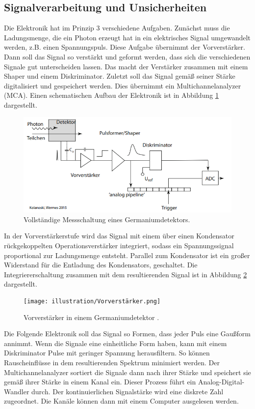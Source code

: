 \subsection{Signalverarbeitung und Unsicherheiten}
Die Elektronik hat im Prinzip 3 verschiedene Aufgaben. Zunächst muss die Ladungsmenge, die ein Photon erzeugt hat in ein elektrisches Signal umgewandelt werden, z.B. einen Spannungspuls.
Diese Aufgabe übernimmt der Vorverstärker. Dann soll das Signal so verstärkt und geformt werden, dass sich die verschiedenen Signale gut unterscheiden lassen. Das macht der Verstärker 
zusammen mit einem Shaper und einem Diskriminator. Zuletzt soll das Signal gemäß seiner Stärke digitalisiert und gespeichert werden. Dies übernimmt ein Multichannelanalyzer (MCA).
Einen schematischen Aufbau der Elektronik ist in Abbildung \ref{fig:Schaltung} dargestellt.
\begin{figure}
    \centering
    \includegraphics[scale=0.8]{illustration/Messchaltung.png}
    \caption{Vollständige Messschaltung eines Germaniumdetektors\cite{Detektor}.}
    \label{fig:Schaltung}
\end{figure}
\noindent In der Vorverstärkerstufe wird das Signal mit einem über einen Kondensator rückgekoppelten Operationsverstärker integriert, sodass ein Spannungssignal proportional zur Ladungsmenge entsteht.
Parallel zum Kondensator ist ein großer Widerstand für die Entladung des Kondensators, geschaltet. Die Integriererschaltung zusammen mit dem resultierenden Signal ist in Abbildung \ref{fig:PreAmp} dargestellt.
\begin{figure}[H]
    \centering
    \texttt{[image: illustration/Vorverstärker.png]}
    \caption{Vorverstärker in einem Germaniumdetektor \cite{Detektor}.}
    \label{fig:PreAmp}
\end{figure}
Die Folgende Elektronik soll das Signal so Formen, dass jeder Puls eine Gaußform annimmt. Wenn die Signale eine einheitliche Form haben, kann mit einem Diskriminator
Pulse mit geringer Spannung herausfiltern. So können Rauscheinflüsse in dem resultierenden Spektrum minimiert werden. 
Der Multichannelanalyzer sortiert die Signale dann nach ihrer Stärke und speichert sie gemäß ihrer Stärke in einem Kanal ein. Dieser Prozess führt ein Analog-Digital-Wandler durch.
Der kontinuierlichen Signalstärke wird eine diskrete Zahl zugeordnet. 
Die Kanäle können dann mit einem Computer ausgelesen werden.

